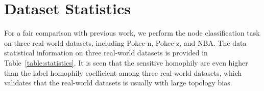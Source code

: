 \documentclass[letterpaper]{article} %
\theoremstyle{plain}
\theoremstyle{definition}
\theoremstyle{remark}
\begin{document}
    

\section{Dataset Statistics}\label{app:stat}
For a fair comparison with previous work, we perform the node classification task on three real-world datasets, including Pokec-n, Pokec-z, and NBA.
The data statistical information on three real-world datasets is provided in Table~\ref{table:statistics}. It is seen that the sensitive homophily are even higher than the label homophily coefficient among three real-world datasets, which validates that the real-world datasets is usually with large topology bias. 

\begin{table}[h]
\fontsize{12}{12}\selectfont  
\setlength{\tabcolsep}{3pt}
\begin{center}
\caption{Statistical Information on Datasets}
\label{table:statistics}
\end{center}
\end{table}
\end{document}
